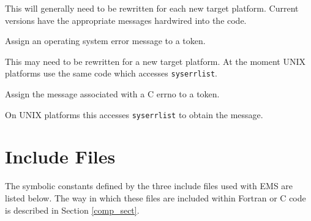 \documentclass[twoside,11pt]{article}
\newcommand{\htmlref}[2]{#1}
\newcommand{\xlabel}[1]{}
\renewcommand{\_}{\texttt{\symbol{95}}}
\begin{document}
\begin {description}
This will generally need to be rewritten for each new target platform.
Current versions have the appropriate messages hardwired into the code.
\item [\htmlref{\texttt{EMS\_SYSER}}{EMS_SYSER}]  Assign an operating system
error message to a token.

This may need to be rewritten for a new target platform. At the
moment UNIX platforms use the same code which accesses \texttt{sys\_errlist}.
\item [\texttt{emsErrno}] Assign the message associated with a C errno to a
token.

On UNIX platforms this accesses \texttt{sys\_errlist} to obtain the message.
\end{description}

\section{\xlabel{include_files}Include Files}
\label{incl_sect}
The symbolic constants defined by the three include files used with EMS are 
listed below. The way in which these files are included within Fortran or
C code is described in Section \ref{comp_sect}.
\end{document}
